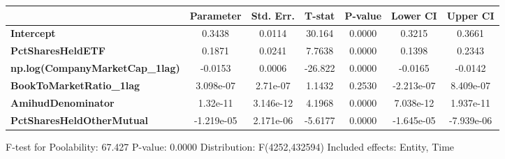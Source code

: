 \begin{center}
\begin{tabular}{lclc}
\bottomrule
\end{tabular}
\begin{tabular}{lcccccc}
                                        & \textbf{Parameter} & \textbf{Std. Err.} & \textbf{T-stat} & \textbf{P-value} & \textbf{Lower CI} & \textbf{Upper CI}  \\
\midrule
\textbf{Intercept}                      &       0.3438       &       0.0114       &      30.164     &      0.0000      &       0.3215      &       0.3661       \\
\textbf{PctSharesHeldETF}               &       0.1871       &       0.0241       &      7.7638     &      0.0000      &       0.1398      &       0.2343       \\
\textbf{np.log(CompanyMarketCap\_1lag)} &      -0.0153       &       0.0006       &     -26.822     &      0.0000      &      -0.0165      &      -0.0142       \\
\textbf{BookToMarketRatio\_1lag}        &     3.098e-07      &      2.71e-07      &      1.1432     &      0.2530      &     -2.213e-07    &     8.409e-07      \\
\textbf{AmihudDenominator}              &      1.32e-11      &     3.146e-12      &      4.1968     &      0.0000      &     7.038e-12     &     1.937e-11      \\
\textbf{PctSharesHeldOtherMutual}       &     -1.219e-05     &     2.171e-06      &     -5.6177     &      0.0000      &     -1.645e-05    &     -7.939e-06     \\
\bottomrule
\end{tabular}
\end{center}

F-test for Poolability: 67.427 \newline
 P-value: 0.0000 \newline
 Distribution: F(4252,432594) \newline
  \newline
 Included effects: Entity, Time